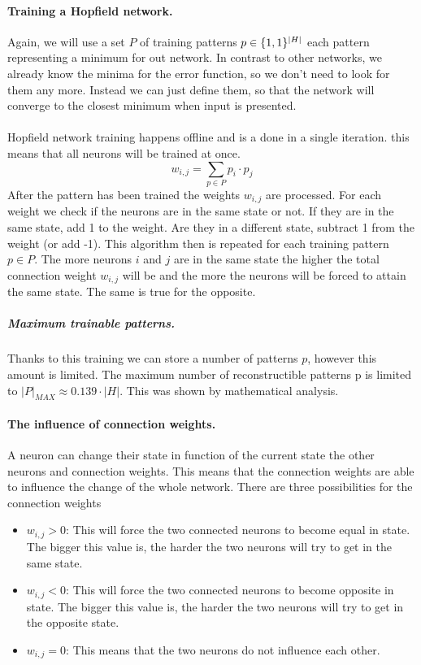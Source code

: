 \documentclass[pdftex,a4paper,12pt,twoside]{report}
\theoremstyle{plain} \newtheorem{theorem}{Theorem} \newtheorem{proposition}{Proposition} \newtheorem{lemma}{Lemma} \newtheorem*{corollary}{Corollary}
\theoremstyle{definition} \newtheorem{definition}{Definition} \newtheorem{conjecture}{Conjecture} \newtheorem*{example}{Example} \newtheorem{algorithm}{Algorithm}
\theoremstyle{remark} \newtheorem*{remark}{Remark} \newtheorem*{note}{Note} \newtheorem{case}{Case}
\begin{document}
\paragraph{Training a Hopfield network.}
Again, we will use a set $P$ of  training patterns $p \in \{\-1,1\}^{|H|}$ each pattern representing a minimum for out network. In contrast to other networks, we already know the minima for the error function, so we don't need to look for them any more. Instead we can just define them, so that the network will converge to the closest minimum when input is presented.\\\\Hopfield network training happens offline and is a done in a single iteration. this means that all neurons will be trained at once.
\begin{equation}
w_{i,j} = \sum_{p \in P} p_i \cdot p_j
\end{equation}
After the pattern has been trained the weights $w_{i,j}$ are processed. For each weight we check if the neurons are in the same state or not. If they are in the same state, add 1 to the weight. Are they in a different state, subtract 1 from the weight (or add -1). This algorithm then is repeated for each training pattern $p \in P$. The more neurons $i$ and $j$ are in the same state the higher the total connection weight $w_{i,j}$ will be and the more the neurons will be forced to attain the same state. The same is true for the opposite.
\subparagraph{Maximum trainable patterns.}
Thanks to this training we can store a number of patterns $p$, however this amount is limited. The maximum number of reconstructible patterns p is limited to $|P|_{MAX} \approx  0.139 \cdot |H|$. This was shown by mathematical analysis.
\paragraph{The influence of connection weights.}
A neuron can change their state in function of the current state the other neurons and connection weights. This means that the connection weights are able to influence the change of the whole network. There are three possibilities for the connection weights
\begin{itemize}
\item$w_{i,j} > 0 $: This will force the two connected neurons to become equal in state. The bigger this value is, the harder the two neurons will try to get in the same state.
\item$w_{i,j} < 0 $: This will force the two connected neurons to become opposite in state. The bigger this value is, the harder the two neurons will try to get in the opposite state.
\item$w_{i,j} = 0 $: This means that the two neurons do not influence each other.
\end{itemize}
\end{document}
